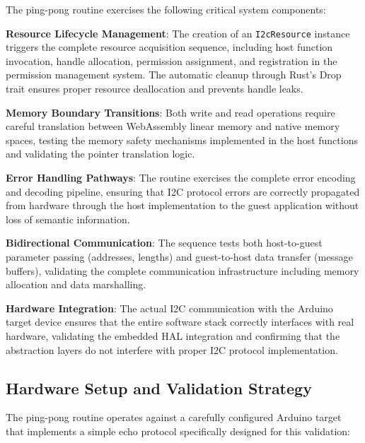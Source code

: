 The ping-pong routine exercises the following critical system components:

\textbf{Resource Lifecycle Management}: The creation of an \texttt{I2cResource} instance triggers the complete resource acquisition sequence, including host function invocation, handle allocation, permission assignment, and registration in the permission management system. The automatic cleanup through Rust's Drop trait ensures proper resource deallocation and prevents handle leaks.

\textbf{Memory Boundary Transitions}: Both write and read operations require careful translation between WebAssembly linear memory and native memory spaces, testing the memory safety mechanisms implemented in the host functions and validating the pointer translation logic.

\textbf{Error Handling Pathways}: The routine exercises the complete error encoding and decoding pipeline, ensuring that I2C protocol errors are correctly propagated from hardware through the host implementation to the guest application without loss of semantic information.

\textbf{Bidirectional Communication}: The sequence tests both host-to-guest parameter passing (addresses, lengths) and guest-to-host data transfer (message buffers), validating the complete communication infrastructure including memory allocation and data marshalling.

\textbf{Hardware Integration}: The actual I2C communication with the Arduino target device ensures that the entire software stack correctly interfaces with real hardware, validating the embedded HAL integration and confirming that the abstraction layers do not interfere with proper I2C protocol implementation.

\subsection{Hardware Setup and Validation Strategy}

The ping-pong routine operates against a carefully configured Arduino target that implements a simple echo protocol specifically designed for this validation:

